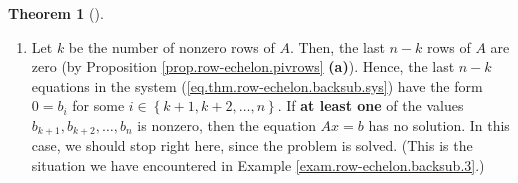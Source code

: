 \documentclass[numbers=enddot,12pt,final,onecolumn,notitlepage]{scrartcl}%
\theoremstyle{definition}
\newtheorem{theo}{Theorem}[section]
\newenvironment{theorem}[1][]
{\begin{theo}[#1]\begin{leftbar}}
{\end{leftbar}\end{theo}}
\begin{document}
\begin{theorem}
\begin{enumerate}
\begin{align*}
\begin{array}
\vdots\\
x_{m}%
\end{array}
\right) \\
&  =\left(
\begin{array}
[c]{c}%
A_{1,1}x_{1}+A_{1,2}x_{2}+\cdots+A_{1,m}x_{m}\\
A_{2,1}x_{1}+A_{2,2}x_{2}+\cdots+A_{2,m}x_{m}\\
\vdots\\
A_{n,1}x_{1}+A_{n,2}x_{2}+\cdots+A_{n,m}x_{m}%
\end{array}
\right)  .
\end{align*}
Thus, the equation $Ax=b$ rewrites as
\[
\left(
\begin{array}
[c]{c}%
A_{1,1}x_{1}+A_{1,2}x_{2}+\cdots+A_{1,m}x_{m}\\
A_{2,1}x_{1}+A_{2,2}x_{2}+\cdots+A_{2,m}x_{m}\\
\vdots\\
A_{n,1}x_{1}+A_{n,2}x_{2}+\cdots+A_{n,m}x_{m}%
\end{array}
\right)  =\left(
\begin{array}
[c]{c}%
b_{1}\\
b_{2}\\
\vdots\\
b_{n}%
\end{array}
\right)
\]
(since $b=\left(
\begin{array}
[c]{c}%
b_{1}\\
b_{2}\\
\vdots\\
b_{n}%
\end{array}
\right)  $). Hence, it is equivalent to the system%
\begin{equation}
\left\{
\begin{array}
[c]{c}%
A_{1,1}x_{1}+A_{1,2}x_{2}+\cdots+A_{1,m}x_{m}=b_{1};\\
A_{2,1}x_{1}+A_{2,2}x_{2}+\cdots+A_{2,m}x_{m}=b_{2};\\
\vdots\\
A_{n,1}x_{1}+A_{n,2}x_{2}+\cdots+A_{n,m}x_{m}=b_{n}%
\end{array}
\right.  . \label{eq.thm.row-echelon.backsub.sys}%
\end{equation}
This is a system of $n$ linear equations in the $m$ unknowns $x_{1}%
,x_{2},\ldots,x_{m}$. We thus focus on solving this system.

\item Let $k$ be the number of nonzero rows of $A$. Then, the last $n-k$ rows
of $A$ are zero (by Proposition \ref{prop.row-echelon.pivrows} \textbf{(a)}).
Hence, the last $n-k$ equations in the system
(\ref{eq.thm.row-echelon.backsub.sys}) have the form $0=b_{i}$ for some
$i\in\left\{  k+1,k+2,\ldots,n\right\}  $. If \textbf{at least one} of the
values $b_{k+1},b_{k+2},\ldots,b_{n}$ is nonzero, then the equation $Ax=b$ has
no solution. In this case, we should stop right here, since the problem is
solved. (This is the situation we have encountered in Example
\ref{exam.row-echelon.backsub.3}.)


\end{enumerate}
\end{theorem}
\end{document}
